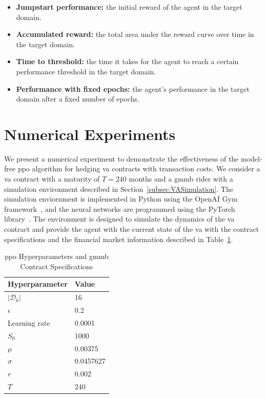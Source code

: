 \begin{itemize}
    \item \textbf{Jumpstart performance:} the initial reward of the agent in the target domain.
    \item \textbf{Accumulated reward:} the total area under the reward curve over time in the target domain.
    \item \textbf{Time to threshold:} the time it takes for the agent to reach a certain performance threshold in the target domain.
    \item \textbf{Performance with fixed epochs:} the agent's performance in the target domain after a fixed number of epochs.
\end{itemize}

\section{Numerical Experiments} \label{sec:Experiments}

We present a numerical experiment to demonstrate the effectiveness of the model-free \gls{ppo} algorithm for hedging \gls{va} contracts with transaction costs.
We consider a \gls{va} contract with a maturity of $T=240$ months and a \gls{gmmb} rider with a simulation environment described in Section~\ref{subsec:VASimulation}.
The simulation enviornment is implemented in Python using the OpenAI Gym framework~\citep{brockman2016openai}, and the neural networks are programmed using the PyTorch library~\citep{paszke2019pytorch}.
The environment is designed to simulate the dynamics of the \gls{va} contract and provide the agent with the current state of the \gls{va} with the contract specifications and the financial market information described in Table~\ref{tab3:hyperparameters}.

\begin{table}[ht!]
    \centering
    \begin{tabular}{ll} 
        \toprule
        Hyperparameter      & Value \\
        \midrule
        $|\mathcal{D}_k|$   & 16        \\
        $\epsilon$          & 0.2       \\
        Learning rate       & 0.0001    \\
        $S_0$               & 1000      \\
        $\mu$               & 0.00375   \\
        $\sigma$            & 0.0457627 \\
        $r$                 & 0.002     \\
        $T$                 & 240       \\
        \bottomrule
    \end{tabular}
    \caption{\gls{ppo} Hyperparameters and \gls{gmmb} Contract Specifications} 
    \label{tab3:hyperparameters}
\end{table}


